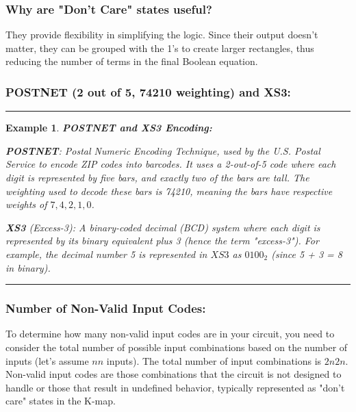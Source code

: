 \documentclass[12pt]{article}
\newtheorem{example}{Example}
\newenvironment{examp}
{\vspace{0.5cm}
\hrule
\begin{example}}
{\hrule
\vspace{0.5cm}
\end{example}}
\begin{document}
\subsubsection*{Why are "Don’t Care" states useful?}
They provide flexibility in simplifying the logic. Since their output doesn't
matter, they can be grouped with the 1’s to create larger rectangles, thus
reducing the number of terms in the final Boolean equation.

\subsubsection*{POSTNET (2 out of 5, 74210 weighting) and XS3:}

\begin{examp}
	\vspace{.5mm}
	\textbf{POSTNET and XS3 Encoding:}
	\vspace{.5mm}
	\begin{list}{-}{\leftmargin=1em \itemindent=0em}
		\item \textbf{POSTNET}: Postal Numeric Encoding Technique, used by the
		      U.S. Postal Service to encode ZIP codes into barcodes. It uses a
		      2-out-of-5 code where each digit is represented by five bars, and
		      exactly two of the bars are tall. The weighting used to decode
		      these bars is 74210, meaning the bars have respective weights of
		      \(7, 4, 2, 1, 0\).
		\item \textbf{XS3} (Excess-3): A binary-coded
		      decimal (BCD) system where each digit is represented by its binary
		      equivalent plus 3 (hence the term "excess-3"). For example, the
		      decimal number 5 is represented in \(XS3\) as \(0100_2\) (since 5 +
		      3 = 8 in binary).
	\end{list}
\end{examp}

\subsubsection*{Number of Non-Valid Input Codes:}

To determine how many non-valid input codes are in your circuit, you need to
consider the total number of possible input combinations based on the number of
inputs (let’s assume $nn$ inputs). The total number of input combinations is
$2n2n$. Non-valid input codes are those combinations that the circuit is not
designed to handle or those that result in undefined behavior, typically
represented as "don’t care" states in the K-map.
\end{document}
